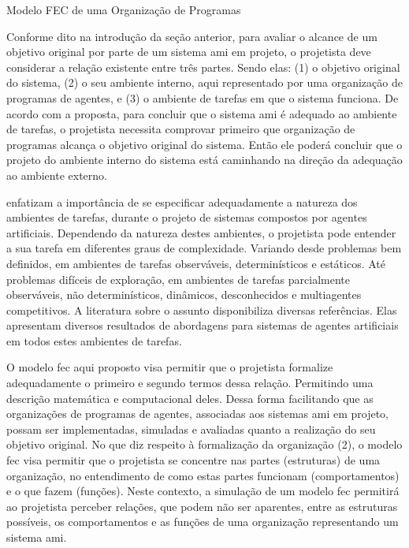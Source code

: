 \begin{section}{Modelo FEC de uma Organização de Programas}
\label{subsec:desc-fec}

    Conforme dito na introdução da seção anterior, para avaliar o alcance de um objetivo original por parte de um sistema \acrshort{ami} em projeto, o projetista deve considerar a relação existente entre três partes. Sendo elas: (1) o objetivo original do sistema, (2) o seu ambiente interno, aqui representado por uma organização de programas de agentes, e (3) o ambiente de tarefas em que o sistema funciona. De acordo com a proposta, para concluir que o sistema \acrshort{ami} é adequado ao ambiente de tarefas, o projetista necessita comprovar primeiro que organização de programas alcança o objetivo original do sistema. Então ele poderá concluir que o projeto do ambiente interno do sistema está caminhando na direção da adequação ao ambiente externo. 

     enfatizam a importância de se especificar adequadamente a natureza dos ambientes de tarefas, durante o projeto de sistemas compostos por agentes artificiais. Dependendo da natureza destes ambientes, o projetista pode entender a sua tarefa em diferentes graus de complexidade. Variando desde problemas bem definidos, em ambientes de tarefas observáveis, determinísticos e estáticos. Até problemas difíceis de exploração, em ambientes de tarefas parcialmente observáveis, não determinísticos, dinâmicos, desconhecidos e multiagentes competitivos. A literatura sobre o assunto disponibiliza diversas referências. Elas apresentam diversos resultados de abordagens para sistemas de agentes artificiais em todos estes ambientes de tarefas.

    O modelo \acrshort{fec} aqui proposto visa permitir que o projetista formalize adequadamente o primeiro e segundo termos dessa relação. Permitindo uma descrição matemática e computacional deles. Dessa forma facilitando que as organizações de programas de agentes, associadas aos sistemas \acrshort{ami} em projeto, possam ser implementadas, simuladas e avaliadas quanto a realização do seu objetivo original. No que diz respeito à formalização da organização (2), o modelo \acrshort{fec} visa permitir que o projetista se concentre nas partes (estruturas) de uma organização, no entendimento de como estas partes funcionam (comportamentos) e o que fazem (funções). Neste contexto, a simulação de um modelo \acrshort{fec} permitirá ao projetista perceber relações, que podem não ser aparentes, entre as estruturas possíveis, os comportamentos e as funções de uma organização representando um sistema \acrshort{ami}.
    

\end{section}
